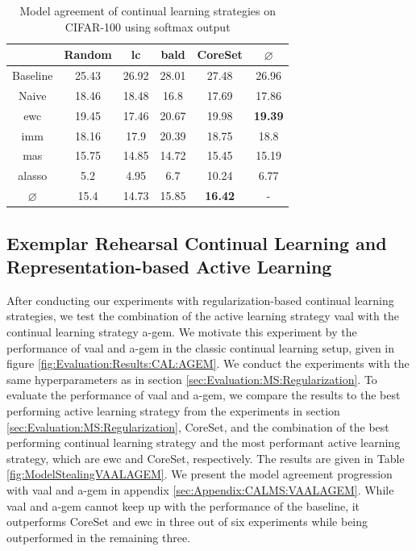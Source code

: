 \begin{table}[h]
    \centering
    \begin{tabular}{ c | c c c c | c } 
         & Random & \gls{lc} & \gls{bald} & CoreSet & $\varnothing$\\ 
        \hline
        Baseline & 25.43 & 26.92 & 28.01 & 27.48 & 26.96 \\
        \hline
        Naive & 18.46 & 18.48 & 16.8 & 17.69 & 17.86\\
        \gls{ewc} & 19.45 & 17.46 & 20.67 & 19.98 & \textbf{19.39}\\
        \gls{imm} & 18.16 & 17.9 & 20.39 & 18.75 & 18.8\\
        \gls{mas} & 15.75 & 14.85 & 14.72 & 15.45 & 15.19\\
        \gls{alasso} & 5.2 & 4.95 & 6.7 & 10.24 & 6.77\\
        \hline
        $\varnothing$ & 15.4 & 14.73 & 15.85 & \textbf{16.42} & -\\
    \end{tabular}
    \caption{Model agreement of continual learning strategies on CIFAR-100 using softmax output}
    \label{fig:ModelStealingCIFAR100Softmax}
\end{table}



\subsection{Exemplar Rehearsal Continual Learning and Representation-based Active Learning}
\label{sec:Evaluation:CALMS:VAAL_AGEM}

After conducting our experiments with regularization-based continual learning strategies, we test the combination of the active learning strategy \gls{vaal}
with the continual learning strategy \gls{a-gem}. We motivate this experiment by the performance of \gls{vaal} and \gls{a-gem} in the classic continual
learning setup, given in figure \ref{fig:Evaluation:Results:CAL:AGEM}. We conduct the experiments with the same hyperparameters as in section 
\ref{sec:Evaluation:MS:Regularization}. To evaluate the performance of \gls{vaal} and \gls{a-gem}, we compare the results to the best performing active
learning strategy from the experiments in section \ref{sec:Evaluation:MS:Regularization}, CoreSet, and the combination of the best
performing continual learning strategy and the most performant active learning strategy, which are \gls{ewc} and CoreSet, respectively. The results are given
in Table \ref{fig:ModelStealingVAALAGEM}. We present the model agreement progression with \gls{vaal} and \gls{a-gem} in appendix
\ref{sec:Appendix:CALMS:VAALAGEM}. While \gls{vaal} and \gls{a-gem} cannot keep up with the performance of the baseline, it outperforms CoreSet and \gls{ewc}
in three out of six experiments while being outperformed in the remaining three. \par

